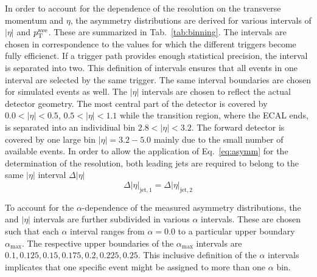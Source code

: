 In order to account for the dependence of the resolution on the transverse momentum and $\eta$, the asymmetry distributions are derived for various intervals of $|\eta|$ and $\pt^\mathrm{ave}$. These are summarized in Tab.~\ref{tab:binning}. The \ptave intervals are chosen in correspondence to the \ptave values for which the different triggers become fully efficienct. If a trigger path provides enough statistical precision, the interval is separated into two. This definition of \ptave intervals ensures that all events in one \ptave interval are selected by the same trigger. The same interval boundaries are chosen for simulated events as well. The $|\eta|$ intervals are chosen to reflect the actual detector geometry. The most central part of the detector is covered by $ 0.0 < |\eta| < 0.5$, $0.5 < |\eta| < 1.1$ while the transition region, where the ECAL ends, is separated into an individiual bin $ 2.8 < |\eta| < 3.2$. The forward detector is covered by one large bin $|\eta| = 3.2 - 5.0$ mainly due to the small number of available events. In order to allow the application of Eq.~\ref{eq:asymm} for the determination of the resolution, both leading jets are required to belong to the same $|\eta|$ interval $\Delta |\eta|$
\begin{equation}
 \Delta |\eta|_{\mathrm{jet},1} = \Delta |\eta|_{\mathrm{jet},2}
\end{equation}
\begin{table}[!t]
\centering
\caption{Overview of the $|\eta|$ and $\pt^\mathrm{ave}$ interval boundaries used for the resolution measurement.}
\label{tab:binning}
\end{table} 
To account for the $\alpha$-dependence of the measured asymmetry distributions, the \ptave and $|\eta|$ intervals are further subdivided in various $\alpha$ intervals. These are chosen such that each $\alpha$ interval ranges from $\alpha = 0.0$ to a particular upper boundary $\alpha_\mathrm{max}$. The respective upper boundaries of the $\alpha_\mathrm{max}$ intervals are $0.1, 0.125, 0.15, 0.175, 0.2, 0.225, 0.25$. This inclusive definition of the $\alpha$ intervals implicates that one specific event might be assigned to more than one $\alpha$ bin. \\
